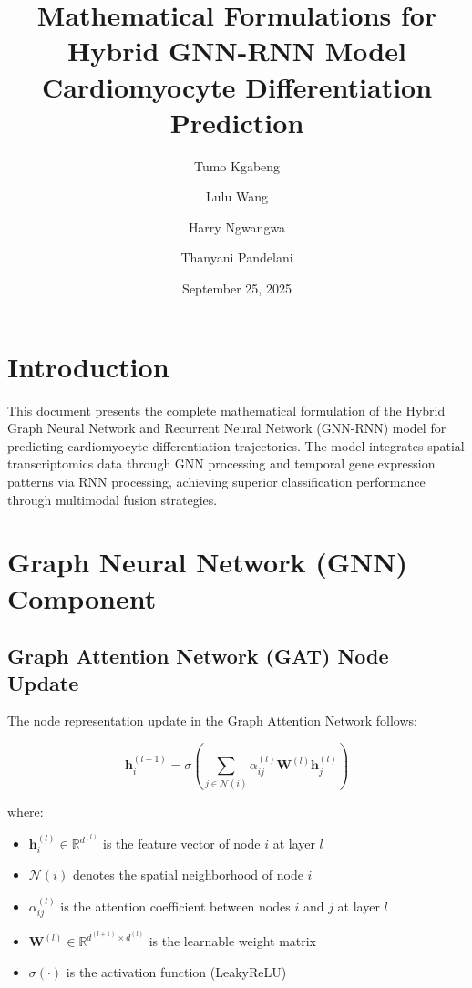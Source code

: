 \documentclass[12pt]{article}
\title{Mathematical Formulations for Hybrid GNN-RNN Model\\
\large{Cardiomyocyte Differentiation Prediction}}
\author{Tumo Kgabeng \and Lulu Wang \and Harry Ngwangwa \and Thanyani Pandelani}
\date{September 25, 2025}
\newcommand{\Real}{\mathbb{R}}
\newcommand{\vecbf}[1]{\mathbf{#1}}
\begin{document}
\maketitle

\tableofcontents
\newpage

\section{Introduction}

This document presents the complete mathematical formulation of the Hybrid Graph Neural Network and Recurrent Neural Network (GNN-RNN) model for predicting cardiomyocyte differentiation trajectories. The model integrates spatial transcriptomics data through GNN processing and temporal gene expression patterns via RNN processing, achieving superior classification performance through multimodal fusion strategies.

\section{Graph Neural Network (GNN) Component}

\subsection{Graph Attention Network (GAT) Node Update}

The node representation update in the Graph Attention Network follows:

\begin{equation}
\vecbf{h}_i^{(l+1)} = \sigma\left(\sum_{j \in \mathcal{N}(i)} \alpha_{ij}^{(l)} \vecbf{W}^{(l)} \vecbf{h}_j^{(l)}\right)
\end{equation}

where:
\begin{itemize}
    \item $\vecbf{h}_i^{(l)} \in \Real^{d^{(l)}}$ is the feature vector of node $i$ at layer $l$
    \item $\mathcal{N}(i)$ denotes the spatial neighborhood of node $i$
    \item $\alpha_{ij}^{(l)}$ is the attention coefficient between nodes $i$ and $j$ at layer $l$
    \item $\vecbf{W}^{(l)} \in \Real^{d^{(l+1)} \times d^{(l)}}$ is the learnable weight matrix
    \item $\sigma(\cdot)$ is the activation function (LeakyReLU)
\end{itemize}
\end{document}
